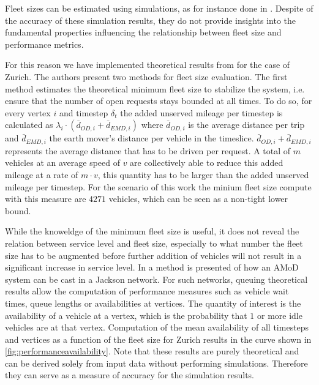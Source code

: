 Fleet sizes can be estimated using simulations, as for instance done in
\citep{bischoff2016simulation}. Despite of the accuracy of these
simulation results, they do not provide insights into the fundamental
properties influencing the relationship between fleet size and performance metrics.

For this reason we have implemented theoretical results from \citep{spieser2014toward}
for the case of Zurich. The authors present two methods for fleet size evaluation.
The first method estimates the theoretical minimum fleet size to stabilize
the system, i.e. ensure that the number of open requests stays bounded at
all times. To do so, for every vertex $i$ and timestep $\delta_t$ the added
unserved mileage per timestep is calculated as
$\lambda_i \cdot ( \bar{d}_{OD,i}  + \bar{d}_{EMD,i})$ where $\bar{d}_{OD,i}$
is the average distance per trip and  $\bar{d}_{EMD,i}$ the earth mover's
distance per vehicle in the timeslice. $\bar{d}_{OD,i}  + \bar{d}_{EMD,i}$
represents the average distance that has to be driven per request. A total of
$m$ vehicles at an average speed of $v$ are collectively able to reduce this
 added mileage at a rate of $m \cdot v$, this quantity has to be larger than the
 added unserved mileage per timestep. For the scenario of this work the
 minium fleet size compute with this measure are $4271$ vehicles, which
 can be seen as a non-tight lower bound.

While the knoweldge of the minimum fleet size is useful, it does not reveal
the relation between service level and fleet size, especially to what number
the fleet size has to be augmented before further addition of vehicles will
not result in a significant increase in service level. In \citep{zhang2016control}
 a method is presented of how an AMoD system can be cast in a Jackson network.
 For such networks, queuing theoretical results allow the computation of
 performance measures such as vehicle wait times, queue lengths or
 availabilities at vertices. The quantity of interest is the availability
 of a vehicle at a vertex, which is the probability that $1$ or more idle
 vehicles are at that vertex. Computation of the mean availability of all
 timesteps and vertices as a function of the fleet size for Zurich results
 in the curve shown in \ref{fig:performanceavailability}. Note that these results are purely theoretical and can be derived solely from input data without performing simulations. Therefore they can serve
as a measure of accuracy for the simulation results.


